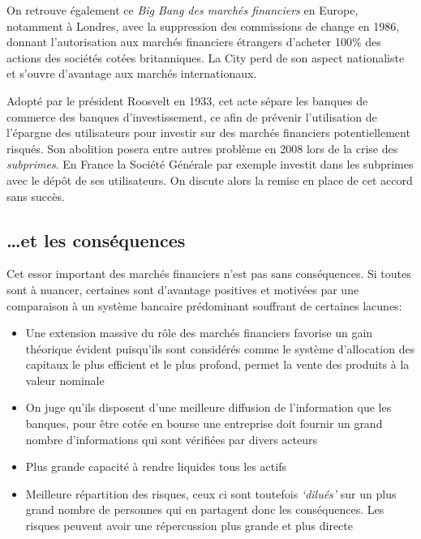 \documentclass[main.tex]{subfiles}
\begin{document}
On retrouve également ce \emph{Big Bang des marchés financiers} en Europe, notamment à Londres, avec la suppression des commissions de change en 1986, donnant l'autorisation aux marchés financiers étrangers d'acheter 100\% des actions des sociétés cotées britanniques. La City perd de son aspect nationaliste et s'ouvre d'avantage aux marchés internationaux.

\begin{definition}
        Adopté par le président Roosvelt en 1933, cet acte sépare les banques de commerce des banques d'investissement, ce afin de prévenir l'utilisation de l'épargne des utilisateurs pour investir sur des marchés financiers potentiellement risqués. Son abolition posera entre autres problème en 2008 lors de la crise des \emph{subprimes}. En France la Société Générale par exemple investit dans les subprimes avec le dépôt de ses utilisateurs. On discute alors la remise en place de cet accord sans succès.
\end{definition}

\subsection{\ldots et les conséquences}

Cet essor important des marchés financiers n'est pas sans conséquences. Si toutes sont à nuancer, certaines sont d'avantage positives et motivées par une comparaison à un système bancaire prédominant souffrant de certaines lacunes:
\begin{itemize}
        \item Une extension massive du rôle des marchés financiers favorise un gain théorique évident puisqu'ils sont considérés comme le système d'allocation des capitaux le plus efficient et le plus profond, permet la vente des produits à la valeur nominale
        \item On juge qu'ils disposent d'une meilleure diffusion de l'information que les banques, pour être cotée en bourse une entreprise doit fournir un grand nombre d'informations qui sont vérifiées par divers acteurs
        \item Plus grande capacité à rendre liquides tous les actifs
        \item Meilleure répartition des risques, ceux ci sont toutefois \textit{`dilués'} sur un plus grand nombre de personnes qui en partagent donc les conséquences. Les risques peuvent avoir une répercussion plus grande et plus directe
\end{itemize}
\end{document}
